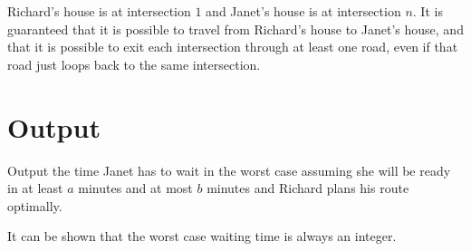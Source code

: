 Richard's house is at intersection $1$ and Janet's house is at
intersection $n$. It is guaranteed that it is possible to travel from Richard's
house to Janet's house, and that it is possible to exit each intersection
through at least one road, even if that road just loops back to the same
intersection.

\section*{Output}
Output the time Janet has to wait in the worst case assuming she will be ready
in at least $a$ minutes and at most $b$ minutes and Richard plans his route
optimally.

It can be shown that the worst case waiting time is always an integer.
